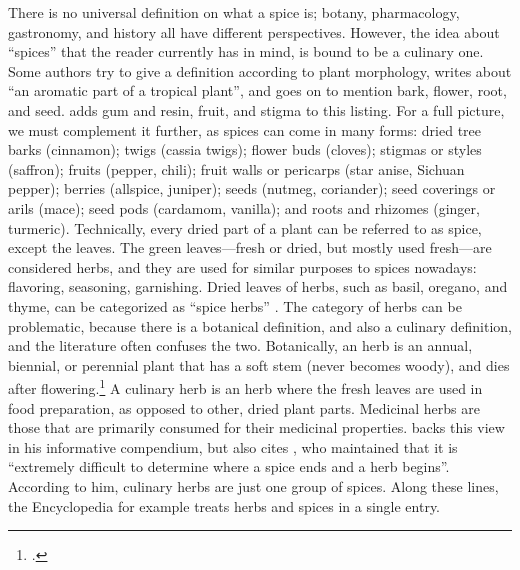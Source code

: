 There is no universal definition on what a spice is; botany, pharmacology, gastronomy, and history all have different perspectives. However, the idea about ``spices'' that the reader currently has in mind, is bound to be a culinary one. Some authors try to give a definition according to plant morphology, \textcite[9]{czarra_spices_2009} writes about ``an aromatic part of a tropical plant'', and goes on to mention bark, flower, root, and seed. \textcite[xix]{turner_spice_2004} adds gum and resin, fruit, and stigma to this listing. For a full picture, we must complement it further, as spices can come in many forms: dried tree barks (cinnamon); twigs
(cassia twigs); flower buds (cloves); stigmas or styles (saffron); fruits (pepper, chili); fruit walls or pericarps (star anise, Sichuan pepper); berries (allspice, juniper); seeds (nutmeg, coriander); seed coverings or arils (mace); seed pods (cardamom, vanilla); and roots and rhizomes (ginger, turmeric). Technically, every dried part of a plant can be referred to as spice, except the leaves. The green leaves---fresh or dried, but mostly used fresh---are considered herbs, and they are used for similar purposes to spices nowadays: flavoring, seasoning, garnishing. Dried leaves of herbs, such as basil, oregano, and thyme, can be categorized as ``spice herbs'' \autocite[see][]{van_wyk_culinary_2014}. The category of herbs can be problematic, because there is a botanical definition, and also a culinary definition, and the literature often confuses the two. Botanically, an herb is an annual, biennial, or perennial plant that has a soft stem (never becomes woody), and dies after flowering.\footcite[herb]{oed} A culinary herb is an herb where the fresh leaves are used in food preparation, as opposed to other, dried plant parts. Medicinal herbs are those that are primarily consumed for their medicinal properties. \textcite[9,16]{oconnell_book_2016} backs this view in his informative compendium, but also cites \textcite[16]{rosengarten_book_1973}, who maintained that it is ``extremely difficult to determine where a spice ends and a herb begins''. According to him, culinary herbs are just one group of spices. Along these lines, the Encyclopedia \textcite{britannica_spice_2022} for example treats herbs and spices in a single entry. 

